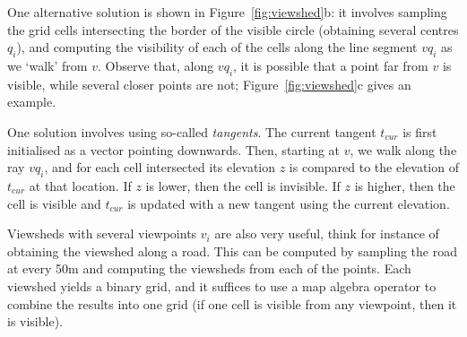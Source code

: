%

One alternative solution is shown in Figure~\ref{fig:viewshed}b: it involves sampling the grid cells intersecting the border of the visible circle (obtaining several centres $q_i$), and computing the visibility of each of the cells along the line segment $vq_i$ as we `walk' from $v$.
Observe that, along $vq_i$, it is possible that a point far from $v$ is visible, while several closer points are not; Figure~\ref{fig:viewshed}c gives an example.

One solution involves using so-called \emph{tangents}.
The current tangent $t_{cur}$ is first initialised as a vector pointing downwards.
Then, starting at $v$, we walk along the ray $vq_i$, and for each cell intersected its elevation $z$ is compared to the elevation of $t_{cur}$ at that location.
If $z$ is lower, then the cell is invisible.
If $z$ is higher, then the cell is visible and $t_{cur}$ is updated with a new tangent using the current elevation.

Viewsheds with several viewpoints $v_i$ are also very useful, think for instance of obtaining the viewshed along a road.
This can be computed by sampling the road at every 50m and computing the viewsheds from each of the points. 
Each viewshed yields a binary grid, and it suffices to use a map algebra operator to combine the results into one grid (if one cell is visible from any viewpoint, then it is visible).


%



